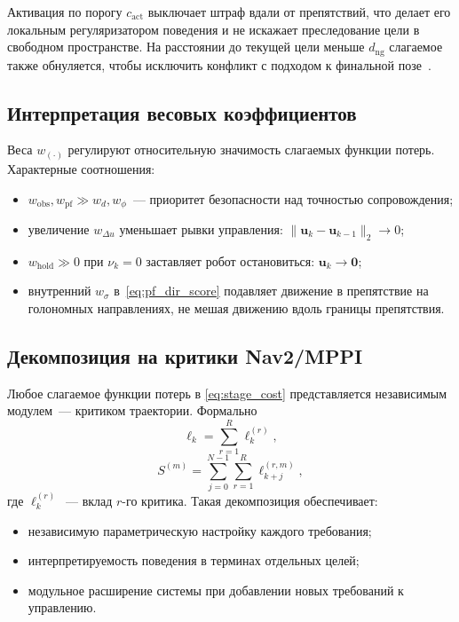 Активация по порогу $c_{\text{act}}$ выключает штраф вдали от
препятствий, что делает его локальным регуляризатором поведения и
не искажает преследование цели в свободном пространстве. На
расстоянии до текущей цели меньше $d_{\text{ng}}$ слагаемое также
обнуляется, чтобы исключить конфликт с подходом к финальной
позе~\cite{Alkhaddad2023MPC}.

\subsection{Интерпретация весовых коэффициентов}

Веса $w_{(\cdot)}$ регулируют относительную значимость слагаемых
функции потерь. Характерные соотношения:
\begin{itemize}
    \item $w_{\text{obs}}, w_{\text{pf}} \gg w_{d}, w_{\phi}$~---
          приоритет безопасности над точностью сопровождения;
    \item увеличение $w_{\Delta u}$ уменьшает рывки управления:
          $\|\mathbf{u}_k - \mathbf{u}_{k-1}\|_2 \to 0$;
    \item $w_{\text{hold}} \gg 0$ при $\nu_k = 0$ заставляет робот
          остановиться: $\mathbf{u}_k \to \mathbf{0}$;
    \item внутренний $w_{\sigma}$ в~\eqref{eq:pf_dir_score} подавляет
          движение в препятствие на голономных направлениях, не
          мешая движению вдоль границы препятствия.
\end{itemize}

\subsection{Декомпозиция на критики Nav2/MPPI}

Любое слагаемое функции потерь в \eqref{eq:stage_cost} представляется
независимым модулем~--- критиком траектории. Формально
\begin{equation}
\ell_k = \sum_{r=1}^{R} \ell_k^{(r)},
\label{eq:decomp_stage}
\end{equation}
\begin{equation}
S^{(m)} = \sum_{j=0}^{N-1} \sum_{r=1}^{R} \ell_{k+j}^{(r,m)},
\label{eq:decomp_S}
\end{equation}
где $\ell_k^{(r)}$~--- вклад $r$-го критика. Такая декомпозиция
обеспечивает:
\begin{itemize}
    \item независимую параметрическую настройку каждого требования;
    \item интерпретируемость поведения в терминах отдельных целей;
    \item модульное расширение системы при добавлении новых требований
          к управлению.
\end{itemize}

